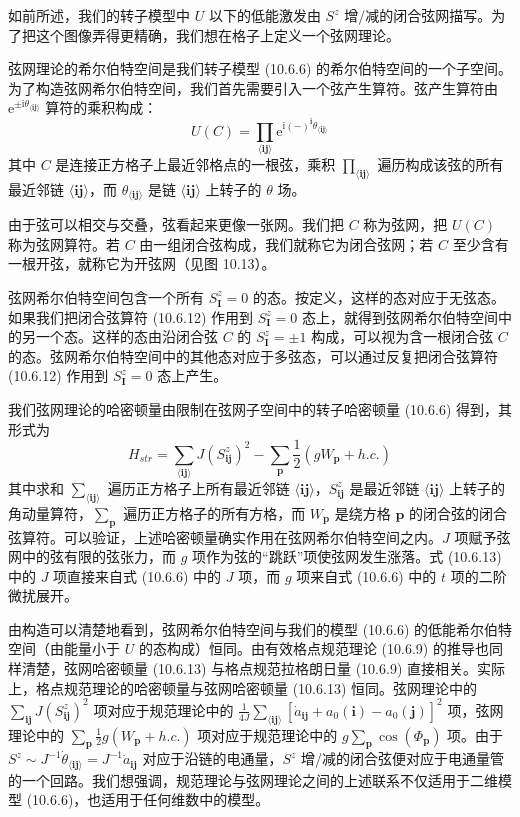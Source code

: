 如前所述，我们的转子模型中 $U$ 以下的低能激发由 $S^{z}$ 增/减的闭合弦网描写。为了把这个图像弄得更精确，我们想在格子上定义一个弦网理论。

弦网理论的希尔伯特空间是我们转子模型 (10.6.6) 的希尔伯特空间的一个子空间。为了构造弦网希尔伯特空间，我们首先需要引入一个弦产生算符。弦产生算符由 $\mathrm{e}^{\pm\mathrm{i}\theta_{\langle\pmb i\pmb j\rangle}}$ 算符的乘积构成：
\begin{equation*}
U(C)=\prod_{\langle\pmb i\pmb j\rangle}\mathrm{e}^{\mathrm{i}(-)^{\pmb i}\theta_{\langle\pmb i\pmb j\rangle}}\tag{10.6.12}
\end{equation*}
其中 $C$ 是连接正方格子上最近邻格点的一根弦，乘积 $\prod_{\langle\pmb i\pmb j\rangle}$ 遍历构成该弦的所有最近邻链 $\langle\pmb i\pmb j\rangle$，而 $\theta_{\langle\pmb i\pmb j\rangle}$ 是链 $\langle\pmb i\pmb j\rangle$ 上转子的 $\theta$ 场。

由于弦可以相交与交叠，弦看起来更像一张网。我们把 $C$ 称为弦网，把 $U(C)$ 称为弦网算符。若 $C$ 由一组闭合弦构成，我们就称它为闭合弦网；若 $C$ 至少含有一根开弦，就称它为开弦网（见图 10.13）。

弦网希尔伯特空间包含一个所有 $S^{z}_{\pmb I}=0$ 的态。按定义，这样的态对应于无弦态。如果我们把闭合弦算符 (10.6.12) 作用到 $S^{z}_{\pmb I}=0$ 态上，就得到弦网希尔伯特空间中的另一个态。这样的态由沿闭合弦 $C$ 的 $S^{z}_{\pmb I}=\pm1$ 构成，可以视为含一根闭合弦 $C$ 的态。弦网希尔伯特空间中的其他态对应于多弦态，可以通过反复把闭合弦算符 (10.6.12) 作用到 $S^{z}_{\pmb I}=0$ 态上产生。

我们弦网理论的哈密顿量由限制在弦网子空间中的转子哈密顿量 (10.6.6) 得到，其形式为
\begin{equation*}
H_{str}=\sum_{\langle\pmb i\pmb j\rangle}J(S^{z}_{\pmb i\pmb j})^{2}-\sum_{\pmb p}\frac{1}{2}(gW_{\pmb p}+h.c.)\tag{10.6.13}
\end{equation*}
其中求和 $\sum_{\langle\pmb i\pmb j\rangle}$ 遍历正方格子上所有最近邻链 $\langle\pmb i\pmb j\rangle$，$S^{z}_{\pmb i\pmb j}$ 是最近邻链 $\langle\pmb i\pmb j\rangle$ 上转子的角动量算符，$\sum_{\pmb p}$ 遍历正方格子的所有方格，而 $W_{\pmb p}$ 是绕方格 $\pmb p$ 的闭合弦的闭合弦算符。可以验证，上述哈密顿量确实作用在弦网希尔伯特空间之内。$J$ 项赋予弦网中的弦有限的弦张力，而 $g$ 项作为弦的“跳跃”项使弦网发生涨落。式 (10.6.13) 中的 $J$ 项直接来自式 (10.6.6) 中的 $J$ 项，而 $g$ 项来自式 (10.6.6) 中的 $t$ 项的二阶微扰展开。

由构造可以清楚地看到，弦网希尔伯特空间与我们的模型 (10.6.6) 的低能希尔伯特空间（由能量小于 $U$ 的态构成）恒同。由有效格点规范理论 (10.6.9) 的推导也同样清楚，弦网哈密顿量 (10.6.13) 与格点规范拉格朗日量 (10.6.9) 直接相关。实际上，格点规范理论的哈密顿量与弦网哈密顿量 (10.6.13) 恒同。弦网理论中的 $\sum_{\pmb i\pmb j}J(S^{z}_{\pmb i\pmb j})^{2}$ 项对应于规范理论中的 $\frac{1}{4J}\sum_{\langle\pmb i\pmb j\rangle}[\dot{a}_{\pmb i\pmb j}+a_0(\pmb i)-a_0(\pmb j)]^{2}$ 项，弦网理论中的 $\sum_{\pmb p}\frac{1}{2}g(W_{\pmb p}+h.c.)$ 项对应于规范理论中的 $g\sum_{\pmb p}\cos(\Phi_{\pmb p})$ 项。由于 $S^{z}\sim J^{-1}\dot{\theta}_{\langle\pmb i\pmb j\rangle}=J^{-1}\dot{a}_{\pmb i\pmb j}$ 对应于沿链的电通量，$S^{z}$ 增/减的闭合弦便对应于电通量管的一个回路。我们想强调，规范理论与弦网理论之间的上述联系不仅适用于二维模型 (10.6.6)，也适用于任何维数中的模型。

